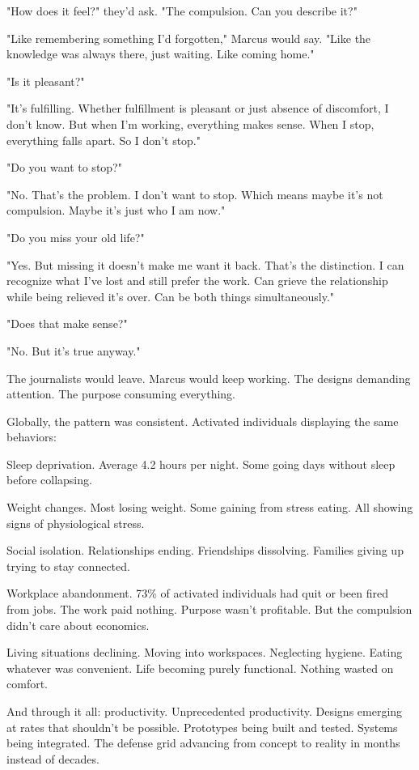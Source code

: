 "How does it feel?" they'd ask. "The compulsion. Can you describe it?"

"Like remembering something I'd forgotten," Marcus would say. "Like the knowledge was always there, just waiting. Like coming home."

"Is it pleasant?"

"It's fulfilling. Whether fulfillment is pleasant or just absence of discomfort, I don't know. But when I'm working, everything makes sense. When I stop, everything falls apart. So I don't stop."

"Do you want to stop?"

"No. That's the problem. I don't want to stop. Which means maybe it's not compulsion. Maybe it's just who I am now."

"Do you miss your old life?"

"Yes. But missing it doesn't make me want it back. That's the distinction. I can recognize what I've lost and still prefer the work. Can grieve the relationship while being relieved it's over. Can be both things simultaneously."

"Does that make sense?"

"No. But it's true anyway."

The journalists would leave. Marcus would keep working. The designs demanding attention. The purpose consuming everything.

\scenebreak

Globally, the pattern was consistent. Activated individuals displaying the same behaviors:

Sleep deprivation. Average 4.2 hours per night. Some going days without sleep before collapsing.

Weight changes. Most losing weight. Some gaining from stress eating. All showing signs of physiological stress.

Social isolation. Relationships ending. Friendships dissolving. Families giving up trying to stay connected.

Workplace abandonment. 73\% of activated individuals had quit or been fired from jobs. The work paid nothing. Purpose wasn't profitable. But the compulsion didn't care about economics.

Living situations declining. Moving into workspaces. Neglecting hygiene. Eating whatever was convenient. Life becoming purely functional. Nothing wasted on comfort.

And through it all: productivity. Unprecedented productivity. Designs emerging at rates that shouldn't be possible. Prototypes being built and tested. Systems being integrated. The defense grid advancing from concept to reality in months instead of decades.


